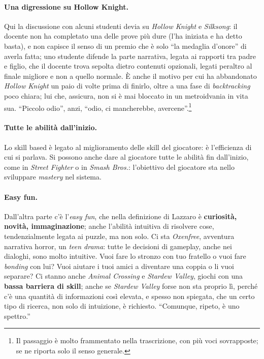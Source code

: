 \paragraph{Una digressione su Hollow Knight.} Qui la discussione con alcuni
studenti devia su \emph{Hollow Knight} e \emph{Silksong}: il docente non ha
completato una delle prove più dure (l'ha iniziata e ha detto basta), e non
capisce il senso di un premio che è solo ``la medaglia d'onore'' di averla
fatta; uno studente difende la parte narrativa, legata ai rapporti tra padre
e figlio, che il docente trova sepolta dietro contenuti opzionali, legati
peraltro al finale migliore e non a quello normale. È anche il motivo per cui
ha abbandonato \emph{Hollow Knight} un paio di volte prima di finirlo, oltre a
una fase di \emph{backtracking} poco chiara; lui che, assicura, non si è mai
bloccato in un metroidvania in vita sua. ``Piccolo odio'', anzi, ``odio, ci
mancherebbe, avercene''.\footnote{Il passaggio è molto frammentato nella
trascrizione, con più voci sovrapposte; se ne riporta solo il senso
generale.}

\paragraph{Tutte le abilità dall'inizio.} Lo skill based è legato al
miglioramento delle skill del giocatore: è l'efficienza di cui si parlava. Si
possono anche dare al giocatore tutte le abilità fin dall'inizio, come in
\emph{Street Fighter} o in \emph{Smash Bros.}: l'obiettivo del giocatore sta
nello sviluppare \emph{mastery} nel sistema.

\paragraph{Easy fun.} Dall'altra parte c'è l'\emph{easy fun}, che nella
definizione di Lazzaro è \textbf{curiosità, novità, immaginazione}; anche
l'abilità intuitiva di risolvere cose, tendenzialmente legata ai puzzle, ma
non solo. Ci sta \emph{Oxenfree}, avventura narrativa horror, un \emph{teen
drama}: tutte le decisioni di gameplay, anche nei dialoghi, sono molto
intuitive. Vuoi fare lo stronzo con tuo fratello o vuoi fare \emph{bonding}
con lui? Vuoi aiutare i tuoi amici a diventare una coppia o li vuoi separare?
Ci stanno anche \emph{Animal Crossing} e \emph{Stardew Valley}, giochi con una
\textbf{bassa barriera di skill}; anche se \emph{Stardew Valley} forse non sta
proprio lì, perché c'è una quantità di informazioni così elevata, e spesso non
spiegata, che un certo tipo di ricerca, non solo di intuizione, è richiesto.
``Comunque, ripeto, è uno spettro.''

